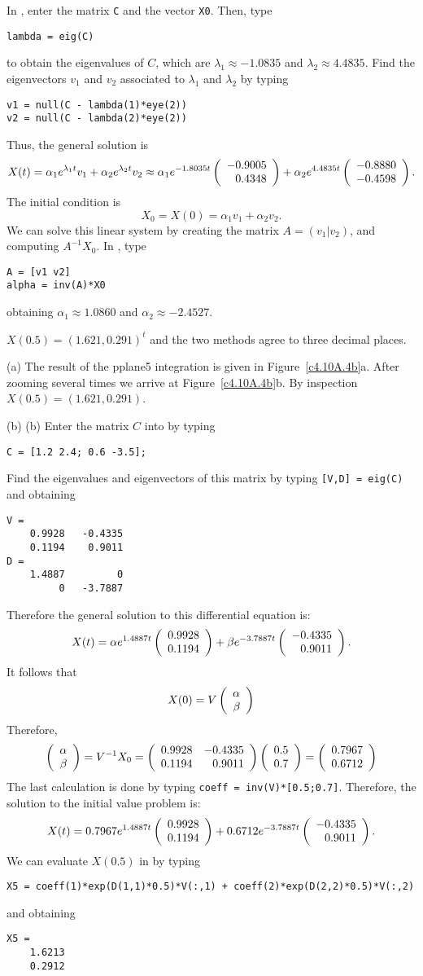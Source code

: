 \documentclass{ximera}
\begin{document}
\soln In \Matlabp, enter the matrix {\tt C} and the vector {\tt X0}.  Then,
type
\begin{verbatim}
lambda = eig(C)
\end{verbatim}
to obtain the eigenvalues of $C$, which are
$\lambda_1 \approx -1.0835$ and $\lambda_2 \approx 4.4835$.  Find the
eigenvectors $v_1$ and $v_2$ associated to $\lambda_1$ and $\lambda_2$
by typing
\begin{verbatim}
v1 = null(C - lambda(1)*eye(2))
v2 = null(C - lambda(2)*eye(2))
\end{verbatim}
Thus, the general solution is
\[
X(t) = \alpha_1e^{\lambda_1 t}v_1 + \alpha_2e^{\lambda_2 t}v_2
\approx \alpha_1e^{-1.8035t}\left(\begin{array}{r} -0.9005 \\  0.4348\end{array}\right) +
\alpha_2e^{4.4835t}\left(\begin{array}{r} -0.8880 \\ -0.4598\end{array}\right).
\]
The initial condition is
\[
X_0 = X(0) = \alpha_1v_1 + \alpha_2v_2.
\]
We can solve this linear system by creating the matrix $A = (v_1|v_2)$, and
computing $A^{-1}X_0$.  In \Matlabp, type
\begin{verbatim}
A = [v1 v2]
alpha = inv(A)*X0
\end{verbatim}
obtaining $\alpha_1 \approx 1.0860$ and $\alpha_2 \approx -2.4527$.

 \ans $X(0.5) = (1.621,0.291)^t$ and the two methods agree
to three decimal places.

\soln (a) The result of the {\sf pplane5} integration is given in 
Figure~\ref{c4.10A.4b}a. After zooming several times we arrive at
Figure~\ref{c4.10A.4b}b.  By inspection $X(0.5)=(1.621,0.291)$.

(b) (b)  Enter the matrix $C$ into \Matlab by typing
\begin{verbatim}
C = [1.2 2.4; 0.6 -3.5];
\end{verbatim}
Find the eigenvalues and eigenvectors of this matrix by typing {\tt [V,D] = eig(C)}
and obtaining
\begin{verbatim}
V =
    0.9928   -0.4335
    0.1194    0.9011
D =
    1.4887         0
         0   -3.7887
\end{verbatim}
Therefore the general solution to this differential equation is:
\[
X(t) = \alpha e^{1.4887 t}\left(\begin{array}{r} 0.9928 \\ 0.1194\end{array}\right) +
\beta e^{-3.7887 t}\left(\begin{array}{r} -0.4335 \\ 0.9011\end{array}\right).
\]
It follows that 
\[
X(0) = V \left(\begin{array}{r} \alpha \\ \beta\end{array}\right)
\]
Therefore,
\[
\left(\begin{array}{r} \alpha \\ \beta\end{array}\right) = V^{-1} X_0 = 
\left(\begin{array}{rr} 0.9928 & -0.4335\\ 0.1194 &0.9011\end{array}\right)\left(\begin{array}{r} 0.5 \\ 0.7\end{array}\right) = \left(\begin{array}{r} 0.7967 \\ 0.6712\end{array}\right)
\]
The last calculation is done by typing {\tt coeff = inv(V)*[0.5;0.7]}. 
Therefore, the solution to the initial value problem is:
\[
X(t) = 0.7967e^{1.4887 t}\left(\begin{array}{r} 0.9928 \\ 0.1194\end{array}\right) +
0.6712e^{-3.7887 t}\left(\begin{array}{r} -0.4335 \\ 0.9011\end{array}\right).
\]
We can evaluate $X(0.5)$ in \Matlab by typing
\begin{verbatim}
X5 = coeff(1)*exp(D(1,1)*0.5)*V(:,1) + coeff(2)*exp(D(2,2)*0.5)*V(:,2)
\end{verbatim}
and obtaining
\begin{verbatim}
X5 =
    1.6213
    0.2912
\end{verbatim}
\end{document}
